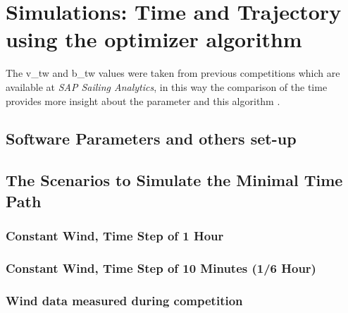\chapter{Simulations: Time and Trajectory using the optimizer algorithm}


The \acrshort{v_tw} and \acrshort{b_tw} values were taken from previous competitions which are available at \textit{SAP Sailing Analytics}\textsuperscript{\textregistered}, in this way the comparison of the time provides more insight about the parameter and this algorithm \cite{SAPsailingana}. 

\section{Software Parameters and others set-up}
\section{The Scenarios to Simulate the Minimal Time Path}
\subsection{Constant Wind, Time Step of 1 Hour}
\subsection{Constant Wind, Time Step of 10 Minutes (1/6 Hour)}
\subsection {Wind data measured during competition}
